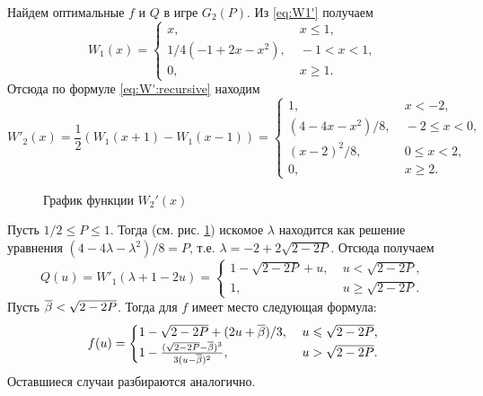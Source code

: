 \begin{example}
  Найдем оптимальные $f$ и $Q$ в игре $G_2(P)$. Из \eqref{eq:W1'} получаем
  \begin{equation*}
    W_1(x) = \begin{cases}
      x, &\; x \leqslant 1,\\
      1/4 (-1 + 2x - x^2), &\; -1 < x < 1,\\
      0, &\; x \geqslant 1.
    \end{cases}
  \end{equation*}
  Отсюда по формуле \eqref{eq:W':recursive} находим
  \begin{equation*}
    W'_2(x) = \frac{1}{2} \left( W_1(x+1) - W_1(x-1) \right) = \begin{cases}
      1, &\; x < -2,\\
      (4 - 4x - x^2)/8, &\; -2 \leqslant x < 0,\\
      (x - 2)^2/8, &\; 0 \leqslant x < 2,\\
      0, &\; x \geqslant 2.
    \end{cases}
  \end{equation*}

  \begin{figure}[h!]
    \centering 
    \caption{График функции $W_2'(x)$}
    \label{fig:w2}
  \end{figure}

  Пусть $1/2 \leqslant P \leqslant 1$. Тогда (см. рис. \ref{fig:w2}) искомое
  $\lambda$ находится как решение уравнения $(4 - 4\lambda - \lambda^2)/8 = P$,
  т.е. $\lambda = -2 + 2\sqrt{2 - 2P}$. Отсюда получаем
  \begin{equation*}
    Q(u) = W'_1(\lambda + 1 - 2u) = \begin{cases}
      1 - \sqrt{2 - 2P} + u, &\; u < \sqrt{2 - 2P},\\
      1, &\; u \geqslant \sqrt{2 - 2P}.
    \end{cases}
  \end{equation*}
  Пусть ${\overline{\beta}} < \sqrt{2 - 2P}$. Тогда для $f$ имеет место следующая формула:
  \begin{equation*}
    f(u) = \begin{cases}
      1 - \sqrt{2 - 2P} + (2u + {\overline{\beta}})/3, &\; u \leqslant \sqrt{2 - 2P},\\
      1 - \frac{(\sqrt{2 - 2P} - {\overline{\beta}})^3}{3(u - {\overline{\beta}})^2}, &\; u > \sqrt{2 - 2P}.
    \end{cases}
  \end{equation*}
  Оставшиеся случаи разбираются аналогично.
\end{example}

